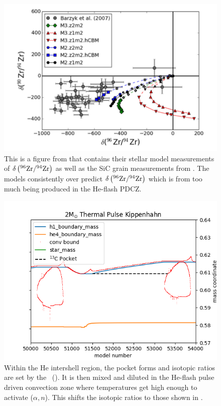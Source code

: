 \documentclass[fleqn,usenatbib]{mnras}
\begin{document}
\begin{figure}
  \includegraphics[width=\columnwidth]{figs/Zr94.png}
  \caption{This is a figure from \citet{zr} that contains their stellar model measurements of $\delta\left(\zirconium[96] / \zirconium[94]\right)$ as well as the SiC grain measurements from \citet{grain}. The models consistently over predict $\delta\left(\zirconium[96] / \zirconium[94]\right)$ which is from too much \zirconium[96] being produced in the He-flash PDCZ.} 
\end{figure}

\begin{figure}
  \includegraphics[width=\columnwidth]{figs/2M_Kippenhahn.png}
  \caption{Within the He intershell region, the \carbon[13] pocket forms and isotopic ratios are set by the \spr~(). It is then mixed and diluted in the He-flash pulse driven convection zone where temperatures get high enough to activate \neon[22]($\alpha,n$)\magnesium[25]. This shifts the isotopic ratios to those shown in .} 
\end{figure}
\end{document}
